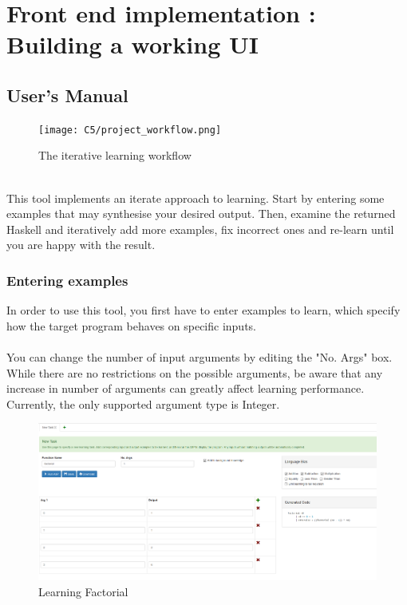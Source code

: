 \chapter{Front end implementation : Building a working UI}

\section{User's Manual}

\begin{figure}[h!]
\centering
\texttt{[image: C5/project\_workflow.png]}
\caption{The iterative learning workflow}
\end{figure}
\mbox{}\\
This tool implements an iterate approach to learning. Start by entering some examples that may synthesise your desired output. Then, examine the returned Haskell and iteratively add more examples, fix incorrect ones and re-learn until you are happy with the result.

\subsection{Entering examples}

In order to use this tool, you first have to enter examples to learn, which specify how the target program behaves on specific inputs.\\ \\
You can change the number of input arguments by editing the "No. Args" box. While there are no restrictions on the possible arguments, be aware that any increase in number of arguments can greatly affect learning performance. Currently, the only supported argument type is Integer. 

\begin{figure}[h!]
\centering
\includegraphics[width=\textwidth]{C5/screenshot_completed.png}
\caption{Learning Factorial}
\end{figure}

